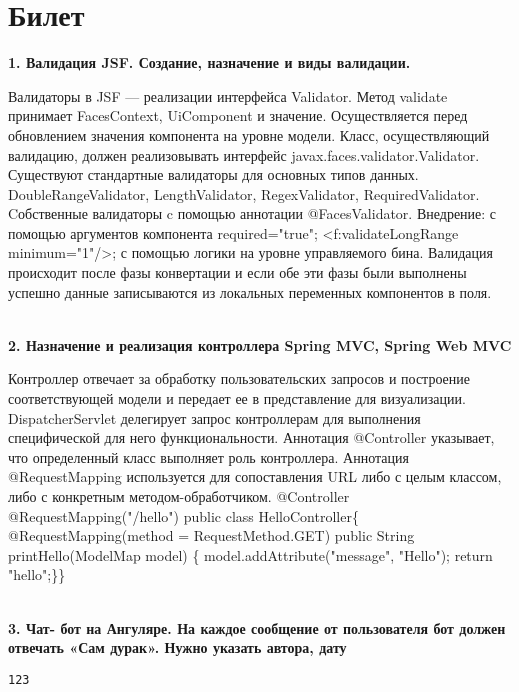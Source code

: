\documentclass{article}
\newcommand{\bil}[5]{%
        \section{Билет}
        \textbf{1. #1}

        #4
        \\
        \textbf{2. #2}
        
        #5
        \\
        \textbf{3. #3}
}
\begin{document}
\bil{Валидация JSF. Создание, назначение и виды валидации.}
{Назначение и реализация контроллера Spring MVC, Spring Web MVC}
{Чат- бот на Ангуляре. На каждое сообщение от пользователя бот должен отвечать «Сам дурак». Нужно указать автора, дату }{
    Валидаторы в JSF — реализации интерфейса Validator. Метод validate принимает FacesContext, UiComponent и значение. Осуществляется перед обновлением значения компонента на уровне модели. Класс, осуществляющий валидацию, должен реализовывать интерфейс javax.faces.validator.Validator. Существуют стандартные валидаторы для основных типов данных. DoubleRangeValidator, LengthValidator, RegexValidator, RequiredValidator. Cобственные валидаторы c помощью аннотации @FacesValidator.
    Внедрение: с помощью аргументов компонента required="true"; <f:validateLongRange minimum="1"/>; с помощью логики на уровне управляемого бина.
    Валидация происходит после фазы конвертации и если обе эти фазы были выполнены успешно данные записываются из локальных переменных компонентов в поля.
}{
    Контроллер отвечает за обработку пользовательских запросов и построение соответствующей модели и передает ее в представление для визуализации.
DispatcherServlet делегирует запрос контроллерам для выполнения специфической для него функциональности. 
Аннотация @Controller указывает, что определенный класс выполняет роль контроллера. 
Аннотация @RequestMapping используется для сопоставления URL либо с целым классом, либо с конкретным методом-обработчиком.
@Controller
@RequestMapping("/hello")
public class HelloController\{
   @RequestMapping(method = RequestMethod.GET)
   public String printHello(ModelMap model) \{
      model.addAttribute("message", "Hello");
      return "hello";\}\}
}
\begin{lstlisting}[frame=single, basicstyle=\ttfamily, breaklines=true, breakatwhitespace=true, postbreak=\mbox{\textcolor{red}{$\hookrightarrow$}\space}]
123
\end{lstlisting}
\end{document}
